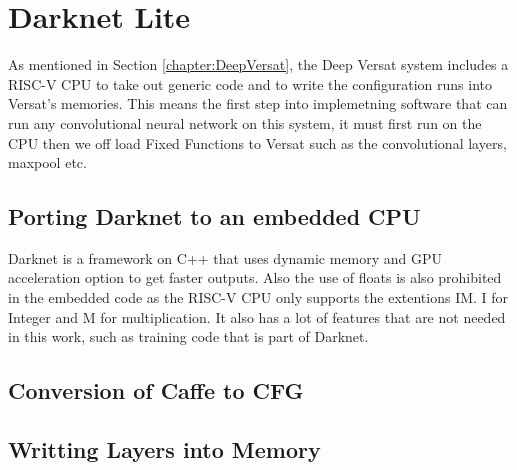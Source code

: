 \chapter{Darknet Lite}
\label{chapter:Darknet}

As mentioned in Section \ref{chapter:DeepVersat}, the Deep Versat system includes a RISC-V CPU to take out generic
code and to write the configuration runs into Versat's memories. This means the first step into implemetning software
that can run any convolutional neural network on this system, it must first run on the CPU then we off load Fixed Functions to Versat such as the convolutional layers, maxpool etc.

\section{Porting Darknet to an embedded CPU}

Darknet is a framework on C++ that uses dynamic memory and GPU acceleration option to get faster outputs. Also the use of floats is also prohibited in the embedded code
as the RISC-V CPU only supports the extentions IM. I for Integer and M for multiplication. It also has a lot of features that are not needed in this work, such as training code
that is part of Darknet.


\section{Conversion of Caffe to CFG}


\section{Writting Layers into Memory}